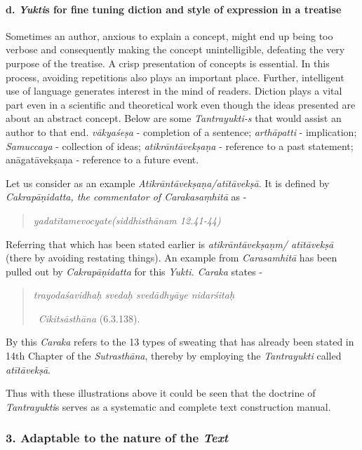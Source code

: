 \paragraph*{d. \textit{Yukti}s for fine tuning diction and style of expression in a treatise}

Sometimes an author, anxious to explain a concept, might end up being too verbose and consequently making the concept unintelligible, defeating the very purpose of the treatise. A crisp presentation of concepts is essential. In this process, avoiding repetitions also plays an important place. Further, intelligent use of language generates interest in the mind of readers. Diction plays a vital part even in a scientific and theoretical work even though the ideas presented are about an abstract concept. Below are some \textit{Tantrayukti-s} that would assist an author to that end. \textit{vākyaśeṣa} - completion of a sentence; \textit{arthāpatti} - implication; \textit{Samuccaya} - collection of ideas; \textit{atikrāntāvekṣaṇa} - reference to a past statement; anāgatāvekṣaṇa - reference to a future event.

Let us consider as an example \textit{Atikrāntāvekṣaṇa/atītāvekṣā}. It is defined by \textit{Cakrapāṇidatta, the commentator of Carakasaṃhitā} as -

\begin{verse}
\textit{yadatītamevocyate}\hfill \textit{(siddhisthānam 12.41-44)}
\end{verse}

Referring that which has been stated earlier is \textit{atikrāntāvekṣaṇm/ atītāvekṣā} (there by avoiding restating things). An example from \textit{Carasamhitā} has been pulled out by \textit{Cakrapāṇidatta} for this \textit{Yukti. Caraka} states -

\begin{verse}
\textit{trayodaśavidhaḥ svedaḥ svedādhyāye nidarśitaḥ}

~\hfill \textit{Cikitsāsthāna} (6.3.138).
\end{verse}

By this \textit{Caraka} refers to the 13 types of sweating that has already been stated in 14th Chapter of the \textit{Sutrasthāna}, thereby by employing the \textit{Tantrayukti} called\textit{ atītāvekṣā}.

Thus with these illustrations above it could be seen that the doctrine of \textit{Tantrayukti}s serves as a systematic and complete text construction manual.


\subsubsection*{3. Adaptable to the nature of the \textit{Text}}

